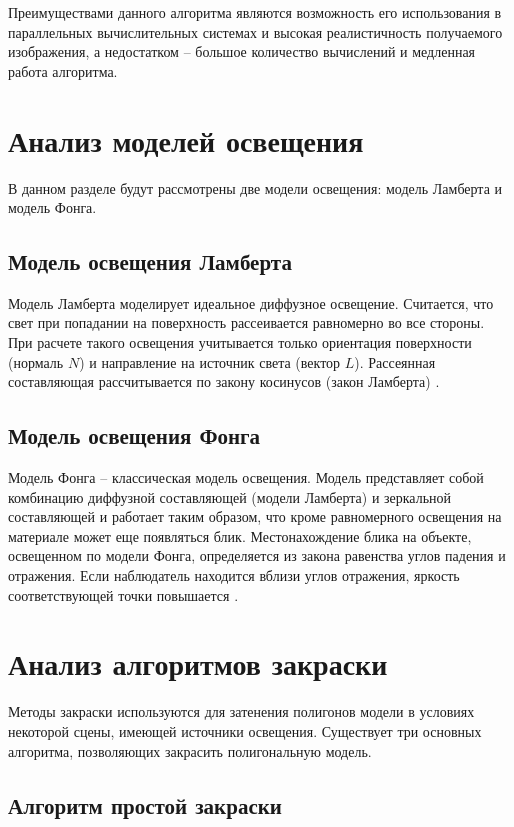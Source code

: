 Преимуществами данного алгоритма являются возможность его использования в параллельных вычислительных системах и высокая реалистичность получаемого изображения, а недостатком -- большое количество вычислений и медленная работа алгоритма.


\section{Анализ моделей освещения}

В данном разделе будут рассмотрены две модели освещения: модель Ламберта и модель Фонга.

\subsection{Модель освещения Ламберта}

Модель Ламберта моделирует идеальное диффузное освещение. 
Считается, что свет при попадании на поверхность рассеивается равномерно во все стороны.
При расчете такого освещения учитывается только ориентация поверхности  (нормаль $N$) и направление на источник света (вектор $L$). 
Рассеянная составляющая рассчитывается по закону косинусов (закон Ламберта) \cite{info_lightModels}.

\subsection{Модель освещения Фонга}

Модель Фонга – классическая модель освещения. 
Модель представляет собой комбинацию диффузной составляющей (модели Ламберта) и зеркальной составляющей и работает таким образом, что кроме равномерного освещения на  материале может еще появляться блик. Местонахождение блика на объекте, освещенном по модели Фонга, определяется из закона равенства углов падения и отражения. 
Если наблюдатель находится вблизи углов отражения, яркость соответствующей точки повышается \cite{info_lightModels}.

\section{Анализ алгоритмов закраски}

Методы закраски используются для затенения полигонов модели в
условиях некоторой сцены, имеющей источники освещения. 
Существует три
основных алгоритма, позволяющих закрасить полигональную модель.

\subsection{Алгоритм простой закраски}

